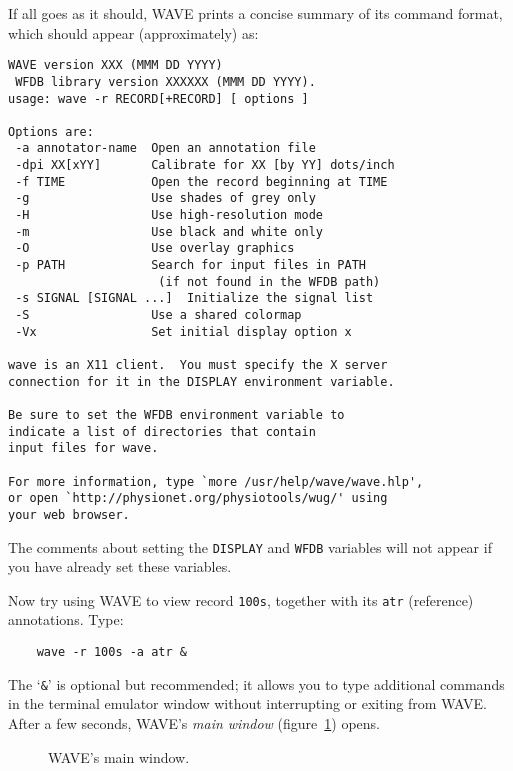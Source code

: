 \documentclass[twoside]{book}
\newcommand{\WAVE}{{\sf WAVE}\xspace}
\begin{document}
If all goes as it should, \WAVE{} prints a concise summary of its command
format, which should appear (approximately) as:
\begin{verbatim}
WAVE version XXX (MMM DD YYYY)
 WFDB library version XXXXXX (MMM DD YYYY).
usage: wave -r RECORD[+RECORD] [ options ]

Options are:
 -a annotator-name  Open an annotation file
 -dpi XX[xYY]       Calibrate for XX [by YY] dots/inch
 -f TIME            Open the record beginning at TIME
 -g                 Use shades of grey only
 -H                 Use high-resolution mode
 -m                 Use black and white only
 -O                 Use overlay graphics
 -p PATH            Search for input files in PATH
                     (if not found in the WFDB path)
 -s SIGNAL [SIGNAL ...]  Initialize the signal list
 -S                 Use a shared colormap
 -Vx                Set initial display option x

wave is an X11 client.  You must specify the X server
connection for it in the DISPLAY environment variable.

Be sure to set the WFDB environment variable to
indicate a list of directories that contain
input files for wave.

For more information, type `more /usr/help/wave/wave.hlp',
or open `http://physionet.org/physiotools/wug/' using
your web browser.
\end{verbatim}
\noindent
The comments about setting the {\tt DISPLAY} and {\tt WFDB} variables will not
appear if you have already set these variables.

Now try using \WAVE{} to view record {\tt 100s}, together with its
{\tt atr} (reference) annotations.  Type:
\begin{verbatim}
    wave -r 100s -a atr &
\end{verbatim}
The `{\tt \&}' is optional but recommended; it allows you to type additional
commands in the terminal emulator window without interrupting or exiting from
\WAVE{}.  After a few seconds, \WAVE{}'s \emph{main window}
(figure~\ref{fig:main-window}) opens.
\begin{htmlonly}
\end{htmlonly}
\begin{latexonly}
\end{latexonly}
\begin{figure}
\centerline{}
\caption{\WAVE{}'s main window.}
\begin{htmlonly}
\end{htmlonly}
\begin{latexonly}
\end{latexonly}
\label{fig:main-window}
\end{figure}
\end{document}
